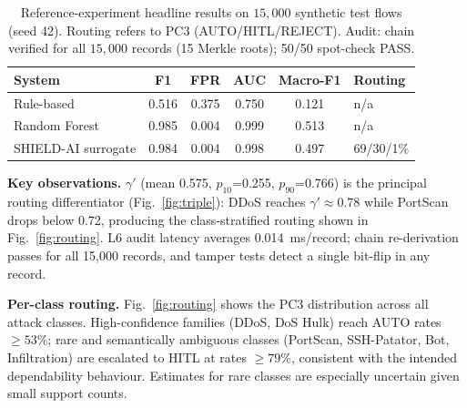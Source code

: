 \documentclass[journal]{IEEEtran}
\begin{document}
\begin{table}[!t]
\renewcommand{\arraystretch}{1.2}
\caption{Reference-experiment headline results on $15{,}000$ synthetic test flows (seed 42).
Routing refers to PC3 (AUTO/HITL/REJECT). Audit: chain verified for all $15{,}000$ records
(15 Merkle roots); 50/50 spot-check PASS.}
\label{tab:exp-headline}
\centering
\scriptsize
\begin{tabular}{lccccl}
\toprule
\textbf{System} & \textbf{F1} & \textbf{FPR} & \textbf{AUC} & \textbf{Macro-F1} & \textbf{Routing} \\
\midrule
Rule-based       & 0.516 & 0.375 & 0.750 & 0.121 & n/a \\
Random Forest    & 0.985 & 0.004 & 0.999 & 0.513 & n/a \\
SHIELD-AI surrogate & 0.984 & 0.004 & 0.998 & 0.497 & 69/30/1\% \\
\bottomrule
\end{tabular}
\end{table}

\textbf{Key observations.} $\gamma'$ (mean 0.575, $p_{10}$=0.255, $p_{90}$=0.766) is the
principal routing differentiator (Fig.~\ref{fig:triple}): DDoS reaches $\gamma'{\approx}0.78$
while PortScan drops below 0.72, producing the class-stratified routing shown in
Fig.~\ref{fig:routing}. L6 audit latency averages 0.014~ms/record; chain re-derivation passes
for all 15{,}000 records, and tamper tests detect a single bit-flip in any record.

\textbf{Per-class routing.} Fig.~\ref{fig:routing} shows the PC3 distribution across all
attack classes. High-confidence families (DDoS, DoS Hulk) reach AUTO rates $\geq 53\%$;
rare and semantically ambiguous classes (PortScan, SSH-Patator, Bot, Infiltration) are
escalated to HITL at rates $\geq 79\%$, consistent with the intended dependability behaviour.
Estimates for rare classes are especially uncertain given small support counts.
\end{document}
